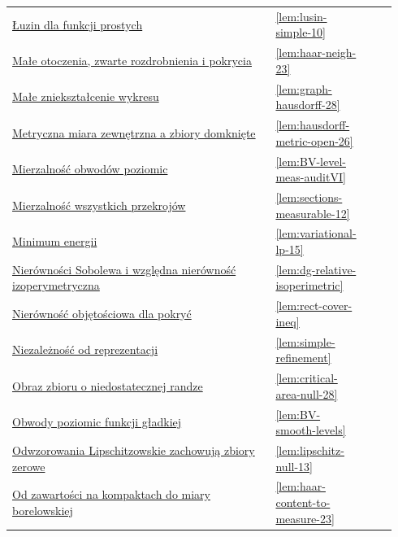 \documentclass[11pt,a4paper,oneside]{book}
\numberwithin{equation}{chapter}
\theoremstyle{plain}
\theoremstyle{definition}
\theoremstyle{remark}
\begin{document}
\begin{longtable}{@{}p{0.72\linewidth}p{0.135\linewidth}p{0.08\linewidth}@{}}
\hyperref[lem:lusin-simple-10]{Łuzin dla funkcji prostych} & \ref*{lem:lusin-simple-10} & \pageref*{lem:lusin-simple-10} \\
\hyperref[lem:haar-neigh-23]{Małe otoczenia, zwarte rozdrobnienia i pokrycia} & \ref*{lem:haar-neigh-23} & \pageref*{lem:haar-neigh-23} \\
\hyperref[lem:graph-hausdorff-28]{Małe zniekształcenie wykresu} & \ref*{lem:graph-hausdorff-28} & \pageref*{lem:graph-hausdorff-28} \\
\hyperref[lem:hausdorff-metric-open-26]{Metryczna miara zewnętrzna a zbiory domknięte} & \ref*{lem:hausdorff-metric-open-26} & \pageref*{lem:hausdorff-metric-open-26} \\
\hyperref[lem:BV-level-meas-auditVI]{Mierzalność obwodów poziomic} & \ref*{lem:BV-level-meas-auditVI} & \pageref*{lem:BV-level-meas-auditVI} \\
\hyperref[lem:sections-measurable-12]{Mierzalność wszystkich przekrojów} & \ref*{lem:sections-measurable-12} & \pageref*{lem:sections-measurable-12} \\
\hyperref[lem:variational-lp-15]{Minimum energii} & \ref*{lem:variational-lp-15} & \pageref*{lem:variational-lp-15} \\
\hyperref[lem:dg-relative-isoperimetric]{Nierówności Sobolewa i względna nierówność izoperymetryczna} & \ref*{lem:dg-relative-isoperimetric} & \pageref*{lem:dg-relative-isoperimetric} \\
\hyperref[lem:rect-cover-ineq]{Nierówność objętościowa dla pokryć} & \ref*{lem:rect-cover-ineq} & \pageref*{lem:rect-cover-ineq} \\
\hyperref[lem:simple-refinement]{Niezależność od reprezentacji} & \ref*{lem:simple-refinement} & \pageref*{lem:simple-refinement} \\
\hyperref[lem:critical-area-null-28]{Obraz zbioru o niedostatecznej randze} & \ref*{lem:critical-area-null-28} & \pageref*{lem:critical-area-null-28} \\
\hyperref[lem:BV-smooth-levels]{Obwody poziomic funkcji gładkiej} & \ref*{lem:BV-smooth-levels} & \pageref*{lem:BV-smooth-levels} \\
\hyperref[lem:lipschitz-null-13]{Odwzorowania Lipschitzowskie zachowują zbiory zerowe} & \ref*{lem:lipschitz-null-13} & \pageref*{lem:lipschitz-null-13} \\
\hyperref[lem:haar-content-to-measure-23]{Od zawartości na kompaktach do miary borelowskiej} & \ref*{lem:haar-content-to-measure-23} & \pageref*{lem:haar-content-to-measure-23} \\

\end{longtable}
\end{document}
